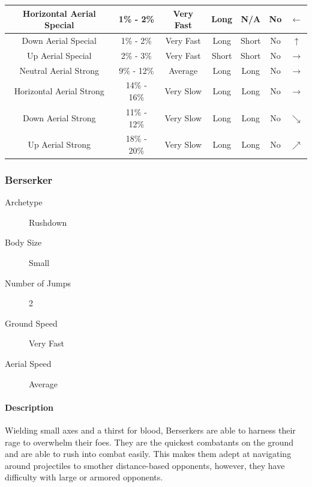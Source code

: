 \begin{table}[h!]
\begin{tabular}{| c | c | c | c | c | c | c |}
        \hline
        Horizontal Aerial Special & 1\% - 2\% & Very Fast & Long & N/A & No & $\leftarrow$ \\
        \hline
        Down Aerial Special & 1\% - 2\% & Very Fast & Long & Short & No & $\uparrow$ \\
        \hline
        Up Aerial Special & 2\% - 3\% & Very Fast & Short & Short & No & $\rightarrow$ \\
        \hline
        Neutral Aerial Strong & 9\% - 12\% & Average & Long & Long & No & $\rightarrow$ \\
        \hline
        Horizontal Aerial Strong & 14\% - 16\% & Very Slow & Long & Long & No & $\rightarrow$ \\
        \hline
        Down Aerial Strong & 11\% - 12\% & Very Slow & Long & Long & No & $\searrow$ \\
        \hline
        Up Aerial Strong & 18\% - 20\% & Very Slow & Long & Long & No & $\nearrow$ \\
        \hline
    \end{tabular}
\end{table}

\pagebreak

\subsubsection{Berserker}

\begin{description}
    \item[Archetype] Rushdown
    \item[Body Size] Small
    \item[Number of Jumps] 2
    \item[Ground Speed] Very Fast
    \item[Aerial Speed] Average   
\end{description}

\paragraph{Description} Wielding small axes and a thirst for blood, Berserkers are able to harness their rage to overwhelm their foes. They are the quickest combatants on the ground and are able to rush into combat easily. This makes them adept at navigating around projectiles to smother distance-based opponents, however, they have difficulty with large or armored opponents.

